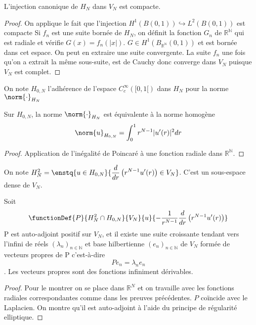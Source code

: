 \documentclass[11pt,a4paper]{article}
\begin{document}
\begin{Prop}
L'injection canonique de $H_N$ dans $V_N$ est compacte. 
\begin{proof}
On applique le fait que l'injection $H^1(B(0,1)) \hookrightarrow L^2(B(0,1))$ est compacte 
Si $f_n$ est une suite bornée de $H_N$, on définit la fonction $G_n$ de $\mathbb{R^N}$ qui est radiale et vérifie $G(x) = f_n(|x|)$. $G \in H^1(B_{\mathbb{R^N}}(0,1))$ et est bornée dans cet espace. On peut en extraire une suite convergente. La suite $f_n$ une fois qu'on a extrait la même sous-suite, est de Cauchy donc converge dans $V_N$ puisque $V_N$ est complet. 
\end{proof}
\end{Prop}

\begin{Def} On note $H_{0,N}$ l'adhérence de l'espace $C_c^\infty([0,1[)$ dans $H_N$ pour la norme $\norm{ \cdot }_{H_N}$
\end{Def}

\begin{Prop}
Sur $H_{0,N}$, la norme $\norm{ \cdot }_{H_N}$ est équivalente à la norme homogène \[ \norm{u}_{H_{0,N}} = \int_{0}^1{r^{N-1}|u'(r)|^2 dr}\]
\begin{proof}
Application de l'inégalité de Poincaré à une fonction radiale dans $\mathbb{R^N}$.
\end{proof}
\end{Prop}

\begin{Def}
On note $H^2_N = \enstq{u\in H_{0,N}}{\displaystyle\frac{d}{dr}\left(r^{N-1}u'(r)\right)\in V_N}$. C'est un sous-espace dense de $V_N$. 
\end{Def}
\begin{Prop} 
Soit \[\functionDef{P}{H^2_N\cap H_{0,N}}{V_N}{u}{-\displaystyle\frac{1}{r^{N-1}}\frac{d}{dr}\left(r^{N-1}u'(r)\right)}\] P est auto-adjoint positif sur $V_N$, et il existe une suite croissante tendant vers l'infini de réels $(\lambda_n)_{n\in\mathbb{N}}$ et base hilbertienne $(e_n)_{n\in \mathbb{N}}$ de $V_N$ formée de vecteurs propres de P c'est-à-dire \[Pe_n = \lambda_n e_n\]. Les vecteurs propres sont des fonctions infiniment dérivables. 
\begin{proof}
Pour le montrer on se place dans $\mathbb{R}^N$ et on travaille avec les fonctions radiales correspondantes comme dans les preuves précédentes. $P$ coïncide avec le Laplacien. On montre qu'il est auto-adjoint à l'aide du principe de régularité elliptique.
\end{proof}
\end{Prop}
\end{document}
